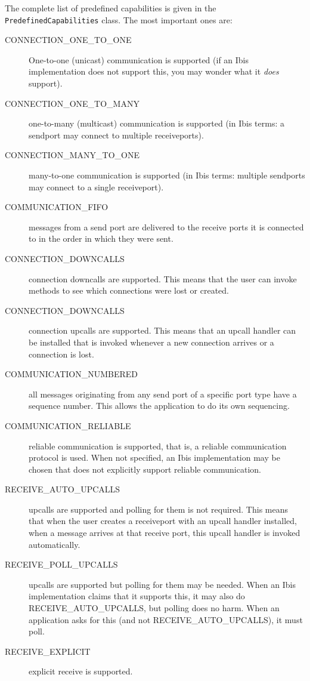 \documentclass[10pt]{article}
\begin{document}
The complete list of predefined capabilities is given in the
\texttt{PredefinedCapabilities} class. The most important ones
are:
\begin{description}
\item[CONNECTION\_ONE\_TO\_ONE]
One-to-one (unicast) communication is supported (if an Ibis implementation
does not support this, you may wonder what it \emph{does} support).
\item[CONNECTION\_ONE\_TO\_MANY]
one-to-many (multicast) communication is supported
(in Ibis terms: a sendport
may connect to multiple receiveports).
\item[CONNECTION\_MANY\_TO\_ONE]
many-to-one communication is supported (in Ibis terms: multiple
sendports may connect to a single receiveport).
\item[COMMUNICATION\_FIFO]
messages from a send port are delivered to the receive ports it is
connected to in the order in which they were sent.
\item[CONNECTION\_DOWNCALLS]
connection downcalls are supported. This means that the user can
invoke methods to see which connections were lost or created.
\item[CONNECTION\_DOWNCALLS]
connection upcalls are supported. This means that an upcall
handler can be installed that is invoked whenever a new connection arrives
or a connection is lost.
\item[COMMUNICATION\_NUMBERED]
all messages originating from any send port of a specific port type have
a sequence number. This allows the application to do its own sequencing.
\item[COMMUNICATION\_RELIABLE]
reliable communication is supported, that is,
a reliable communication protocol is used.
When not specified, an Ibis implementation may be chosen that does not explicitly
support reliable communication.
\item[RECEIVE\_AUTO\_UPCALLS]
upcalls are supported and polling for them is not required.
This means that when the user creates a receiveport with an upcall
handler installed, when a message arrives at that receive port, 
this upcall handler is invoked automatically.
\item[RECEIVE\_POLL\_UPCALLS]
upcalls are supported but polling for them may be needed. When an
Ibis implementation claims that it supports this, it may also do
RECEIVE\_AUTO\_UPCALLS, but polling does no harm. When an application asks for
this (and not RECEIVE\_AUTO\_UPCALLS), it must poll.
\item[RECEIVE\_EXPLICIT]
explicit receive is supported.

\end{description}
\end{document}

